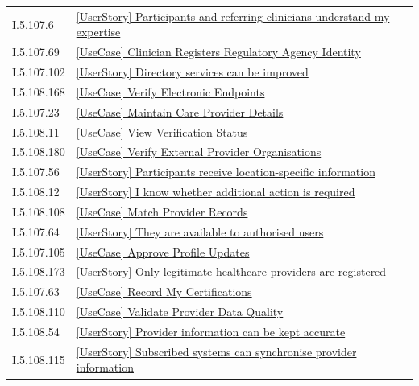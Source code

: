 \begin{longtable}{p{.22\linewidth}p{.73\linewidth}}
I.5.107.6 & \hyperref[element:9a0368b5117645daa3068be0e49887f7]{[UserStory] Participants and referring clinicians understand my expertise} \\
I.5.107.69 & \hyperref[element:9b91c7a6e3e74de48989ca686ca5a974]{[UseCase] Clinician Registers Regulatory Agency Identity} \\
I.5.107.102 & \hyperref[element:9c122f5ff8ca40f8a43c0438c6fa5473]{[UserStory] Directory services can be improved} \\
I.5.108.168 & \hyperref[element:9e0c9141497b4e3eb2e69cfcf7c9f705]{[UseCase] Verify Electronic Endpoints} \\
I.5.107.23 & \hyperref[element:9e414e583baa4bb3915a0e6511606c47]{[UseCase] Maintain Care Provider Details} \\
I.5.108.11 & \hyperref[element:a1cfd2dbcd4c4c419291029300c5a401]{[UseCase] View Verification Status} \\
I.5.108.180 & \hyperref[element:a270a4686cb94391ae31856586872d78]{[UseCase] Verify External Provider Organisations} \\
I.5.107.56 & \hyperref[element:a2b5b21c23ca40089b50d7f8b28c53dd]{[UserStory] Participants receive location-specific information} \\
I.5.108.12 & \hyperref[element:a2bc222e09a04ebb9791afde2cf739be]{[UserStory] I know whether additional action is required} \\
I.5.108.108 & \hyperref[element:a71f02b029484871a9e18f236e9d03b4]{[UseCase] Match Provider Records} \\
I.5.107.64 & \hyperref[element:a7ebb98d725848989621c42b1d30c2c8]{[UserStory] They are available to authorised users} \\
I.5.107.105 & \hyperref[element:aa03235d12ed4ad0adcfaa5d82b7f9a7]{[UseCase] Approve Profile Updates} \\
I.5.108.173 & \hyperref[element:ab3b883d815b41eca4f3f324b818720e]{[UserStory] Only legitimate healthcare providers are registered} \\
I.5.107.63 & \hyperref[element:ac87abdb6d3c473cb29493ab56d3b0b1]{[UseCase] Record My Certifications} \\
I.5.108.110 & \hyperref[element:ad1d53e4ddb7428b96960562518fc625]{[UseCase] Validate Provider Data Quality} \\
I.5.108.54 & \hyperref[element:adac0800f76b4590a18fa4286c7c77a0]{[UserStory] Provider information can be kept accurate} \\
I.5.108.115 & \hyperref[element:ae037773b2444fb7956bea1f2da06237]{[UserStory] Subscribed systems can synchronise provider information} \\

\end{longtable}
